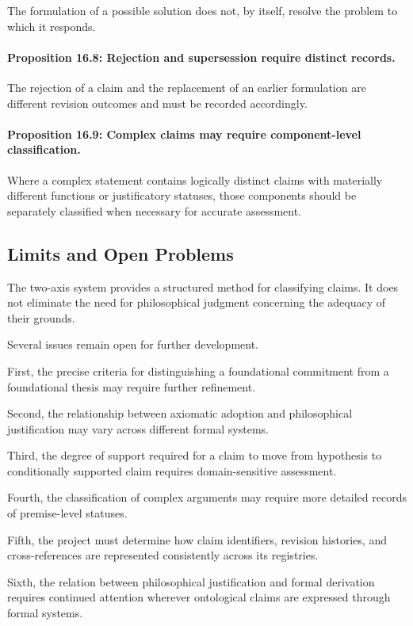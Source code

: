 The formulation
of a possible
solution does
not, by
itself, resolve
the problem
to which
it responds.

\paragraph{Proposition 16.8: Rejection and supersession require distinct records.}

The rejection
of a claim
and the
replacement of
an earlier
formulation are
different revision
outcomes and
must be
recorded accordingly.

\paragraph{Proposition 16.9: Complex claims may require component-level classification.}

Where a
complex statement
contains logically
distinct claims
with materially
different functions
or justificatory
statuses, those
components should
be separately
classified when
necessary for
accurate assessment.

\subsection{Limits and Open Problems}

The two-axis
system provides
a structured
method for
classifying claims.
It does
not eliminate
the need
for philosophical
judgment concerning
the adequacy
of their
grounds.

Several issues
remain open
for further
development.

First, the
precise criteria
for distinguishing
a foundational
commitment from
a foundational
thesis may
require further
refinement.

Second, the
relationship between
axiomatic adoption
and philosophical
justification may
vary across
different formal
systems.

Third, the
degree of
support required
for a
claim to
move from
hypothesis to
conditionally supported
claim requires
domain-sensitive
assessment.

Fourth, the
classification of
complex arguments
may require
more detailed
records of
premise-level
statuses.

Fifth, the
project must
determine how
claim identifiers,
revision histories,
and cross-references
are represented
consistently across
its registries.

Sixth, the
relation between
philosophical
justification and
formal derivation
requires continued
attention wherever
ontological claims
are expressed
through formal
systems.

